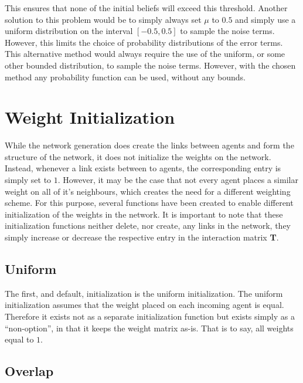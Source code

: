 \documentclass{article}
\newcommand{\T}{\textbf{T}}
\begin{document}
This ensures that none of the initial beliefs will exceed this threshold. Another solution to this problem would be to simply always set $\mu$ to $0.5$ and simply use a uniform distribution on the interval $[-0.5, 0.5]$ to sample the noise terms. However, this limits the choice of probability distributions of the error terms. This alternative method would always require the use of the uniform, or some other bounded distribution, to sample the noise terms. However, with the chosen method any probability function can be used, without any bounds.

\section{Weight Initialization}

While the network generation does create the links between agents and form the structure of the network, it does not initialize the weights on the network. Instead, whenever a link exists between to agents, the corresponding entry is simply set to $1$. However, it may be the case that not every agent places a similar weight on all of it's neighbours, which creates the need for a different weighting scheme. For this purpose, several functions have been created to enable different initialization of the weights in the network. It is important to note that these initialization functions neither delete, nor create, any links in the network, they simply increase or decrease the respective entry in the interaction matrix \T.

\subsection{Uniform}

The first, and default, initialization is the uniform initialization. The uniform initialization assumes that the weight placed on each incoming agent is equal. Therefore it exists not as a separate initialization function but exists simply as a \enquote{non-option}, in that it keeps the weight matrix as-is. That is to say, all weights equal to $1$.

\subsection{Overlap}
\end{document}
